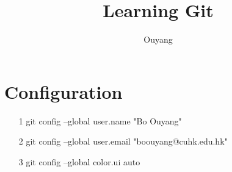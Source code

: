 \documentclass[10pt,a4paper]{article}
\author{Ouyang}
\title{Learning Git}
\begin{document}
	\maketitle
	\section{Configuration}
	\begin{itemize}
		\item[1] git config --global user.name "Bo Ouyang"
		\item[2] git config --global user.email "boouyang@cuhk.edu.hk"
		\item[3] git config --global color.ui auto
	\end{itemize}
\end{document}
